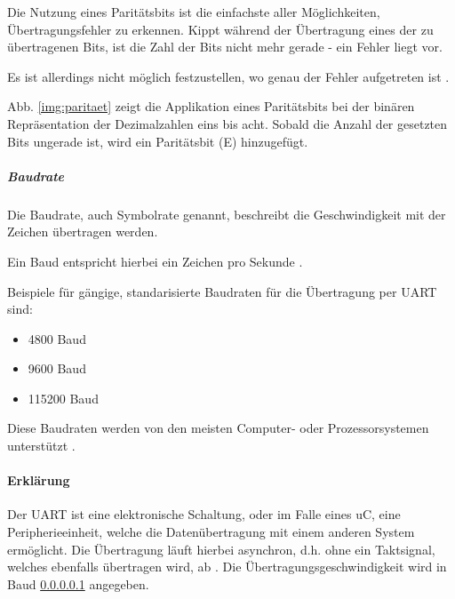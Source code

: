 \smallskip
Die Nutzung eines Paritätsbits ist die einfachste aller Möglichkeiten, Übertragungsfehler zu erkennen. Kippt während der Übertragung eines
der zu übertragenen Bits, ist die Zahl der Bits nicht mehr gerade - ein Fehler liegt vor.

Es ist allerdings nicht möglich festzustellen, wo genau der Fehler aufgetreten ist \citep{Bussysteme}.

\smallskip

Abb. \ref{img:paritaet} zeigt die Applikation eines Paritätsbits bei der binären Repräsentation der Dezimalzahlen eins bis acht. Sobald die Anzahl der 
gesetzten Bits ungerade ist, wird ein Paritätsbit (E) hinzugefügt.

\subparagraph{Baudrate}\label{para:baud}

Die Baudrate, auch Symbolrate genannt, beschreibt die Geschwindigkeit mit der Zeichen übertragen werden.

Ein Baud entspricht hierbei ein Zeichen pro Sekunde \citep{Bussysteme}.

Beispiele für gängige, standarisierte Baudraten für die Übertragung per \ac{UART} sind:

\begin{itemize}
    \item 4800 Baud
    \item 9600 Baud
    \item 115200 Baud
\end{itemize}

Diese Baudraten werden von den meisten Computer- oder Prozessorsystemen unterstützt \citep{Bussysteme}.

\newpage

\paragraph{Erklärung}

Der \acl{UART} ist eine elektronische Schaltung, oder im Falle eines \ac{uC}, eine Peripherieeinheit, welche
die Datenübertragung mit einem anderen System ermöglicht. Die Übertragung läuft hierbei asynchron,
d.h. ohne ein Taktsignal, welches ebenfalls übertragen wird, ab \citep{Bussysteme}. Die Übertragungsgeschwindigkeit
wird in Baud  \ref{para:baud} angegeben.

\smallskip

